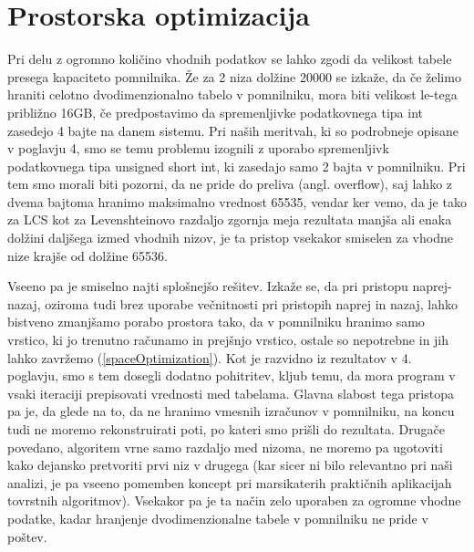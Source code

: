 \documentclass[a4paper,12pt,openright]{book}
\begin{document}
\section{Prostorska optimizacija}

Pri delu z ogromno količino vhodnih podatkov se lahko zgodi da velikost tabele presega kapaciteto pomnilnika. Že za 2 niza dolžine 20000 se izkaže, da če želimo hraniti celotno dvodimenzionalno tabelo v pomnilniku, mora biti velikost le-tega približno 16GB, če predpostavimo da spremenljivke podatkovnega tipa int zasedejo 4 bajte na danem sistemu. Pri naših meritvah, ki so podrobneje opisane v poglavju 4, smo se temu problemu izognili z uporabo spremenljivk podatkovnega tipa unsigned short int, ki zasedajo samo 2 bajta v pomnilniku. Pri tem smo morali biti pozorni, da ne pride do preliva (angl. overflow), saj lahko z dvema bajtoma hranimo maksimalno vrednost 65535, vendar ker vemo, da je tako za LCS kot za Levenshteinovo razdaljo zgornja meja rezultata manjša ali enaka dolžini daljšega izmed vhodnih nizov, je ta pristop vsekakor smiselen za vhodne nize krajše od dolžine 65536. 

Vseeno pa je smiselno najti splošnejšo rešitev. Izkaže se, da pri pristopu naprej-nazaj, oziroma tudi brez uporabe večnitnosti pri pristopih naprej in nazaj, lahko bistveno zmanjšamo porabo prostora tako, da v pomnilniku hranimo samo vrstico, ki jo trenutno računamo in prejšnjo vrstico, ostale so nepotrebne in jih lahko zavržemo (\ref{spaceOptimization}). Kot je razvidno iz rezultatov v 4. poglavju, smo s tem dosegli dodatno pohitritev, kljub temu, da mora program v vsaki iteraciji prepisovati vrednosti med tabelama. Glavna slabost tega pristopa pa je, da glede na to, da ne hranimo vmesnih izračunov v pomnilniku, na koncu tudi ne moremo rekonstruirati poti, po kateri smo prišli do rezultata. Drugače povedano, algoritem vrne samo razdaljo med nizoma, ne moremo pa ugotoviti kako dejansko pretvoriti prvi niz v drugega (kar sicer ni bilo relevantno pri naši analizi, je pa vseeno pomemben koncept pri marsikaterih praktičnih aplikacijah tovrstnih algoritmov). Vsekakor pa je ta način zelo uporaben za ogromne vhodne podatke, kadar hranjenje dvodimenzionalne tabele v pomnilniku ne pride v poštev. 

\bigskip
\bigskip
\end{document}
